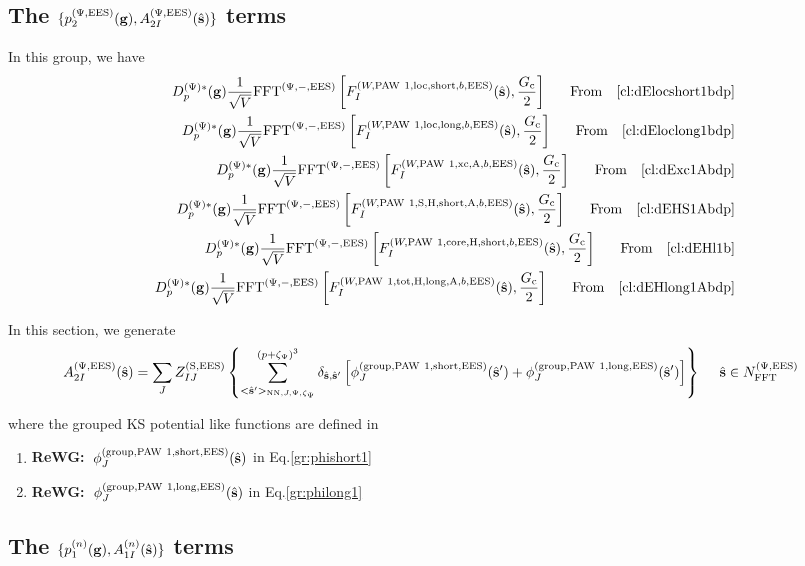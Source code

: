 \documentclass[paper=a4, fontsize=11pt]{article} %
\numberwithin{equation}{section} %
\numberwithin{figure}{section} %
\numberwithin{table}{section} %
\newcommand{\bg}{{\bf{g}}}
\newcommand{\hs}{{\hat{\bf{s}}}}
\newcommand{\rS}{{\mathrm{S}}}
\newcommand{\rEES}{{\mathrm{EES}}}
\newcommand{\rxc}{{\mathrm{xc}}}
\newcommand{\rgr}{{\mathrm{group}}}
\newcommand{\rcore}{{\mathrm{core}}}
\newcommand{\rNN}{{\mathrm{NN}}}
\newcommand{\rshort}{{\mathrm{short}}}
\newcommand{\rlong}{{\mathrm{long}}}
\newcommand{\rP}{{\mathrm{PAW}}}
\newcommand{\rH}{{\mathrm{H}}}
\newcommand{\rA}{{\mathrm{A}}}
\newcommand{\rlo}{{\mathrm{loc}}}
\newcommand{\rtot}{{\mathrm{tot}}}
\newcommand{\NFFTpEES}{{N^{\mathrm{(\Psi,\rEES})}_{\mathrm{FFT}}}}
\newcommand{\hGc}{{\frac{G_{\mathrm{c}}}{2}}}
\newcommand{\Dpgc}{{D^{(\Psi)*}_p(\bg)}}
\newcommand{\FFTpiEES}{{\mathrm{FFT}^{(\Psi,-,\rEES)}}}
\newcommand{\pzp}{{(p+\zeta_{\Psi})^3}}
\newcommand{\hspJp}{{<\hs'>_{\rNN,J,\Psi,\zeta_\Psi}}}
\newcommand{\hsinpEES}{{\ \ \ \ \hs \in \NFFTpEES}}
\newcommand{\fr}{{\nonumber \ \ \ \ \ \mathrm{From}\ \ \ }}
\newcommand{\ReWG}{{{\bf ReWG:\ }}}
\begin{document}
\subsection{The $\{p_2^{(\Psi,\rEES)}(\bg), A_{2I}^{(\Psi,\rEES)}(\hs)\}$ terms}

In this group, we have
\begin{eqnarray}
&& \Dpgc \frac{1}{\sqrt V} \FFTpiEES \left[F_I^{(W,\rP\ 1,\rlo,\rshort,b,\rEES)}(\hs),\hGc\right] \fr \eqref{cl:dElocshort1bdp}\\
&& \Dpgc \frac{1}{\sqrt V} \FFTpiEES \left[F_I^{(W,\rP\ 1,\rlo,\rlong,b,\rEES)}(\hs),\hGc\right]\fr \eqref{cl:dEloclong1bdp}\\
&& \Dpgc \frac{1}{\sqrt V} \FFTpiEES \left[F_I^{(W,\rP\ 1,\rxc,\rA,b,\rEES)}(\hs),\hGc\right]\fr \eqref{cl:dExc1Abdp}\\
&& \Dpgc \frac{1}{\sqrt V} \FFTpiEES \left[F_I^{(W,\rP\ 1,\rS,\rH,\rshort,\rA,b,\rEES)}(\hs),\hGc\right] \fr \eqref{cl:dEHS1Abdp}\\
&& \Dpgc \frac{1}{\sqrt V} \FFTpiEES \left[F_I^{(W,\rP\ 1,\rcore,\rH,\rshort,b,\rEES)}(\hs),\hGc\right] \fr \eqref{cl:dEHl1b}\\
&&  \Dpgc \frac{1}{\sqrt{V}} \FFTpiEES\left[ F_I^{(W,\rP\ 1,\rtot,\rH,\rlong,\rA,b,\rEES)}(\hs),\hGc\right] \fr \eqref{cl:dEHlong1Abdp}
\end{eqnarray}

In this section, we generate 
\begin{equation}
\begin{split}\label{gr:groupedFDPsi}
A_{2I}^{(\Psi,\rEES)}(\hs) 
&=\sum_J Z_{IJ}^{(\rS,\rEES)} \left\{\sum_{\hspJp}^\pzp  \delta_{\hs,\hs'} \left[\phi_J^{(\rgr,\rP\ 1,\rshort,\rEES)}(\hs') + \phi_J^{(\rgr,\rP\ 1,\rlong,\rEES)}(\hs') \right] \right\} \hsinpEES
\end{split}
\end{equation}

where the grouped KS potential like functions are defined in
\begin{enumerate}
\item \ReWG $\phi_J^{(\rgr,\rP\ 1,\rshort,\rEES)}(\hs)$ in Eq.\eqref{gr:phishort1}
\item \ReWG $\phi_J^{(\rgr,\rP\ 1,\rlong,\rEES)}(\hs)$ in Eq.\eqref{gr:philong1}
\end{enumerate}

\subsection{The $\{p_1^{(n)}(\bg), A_{1I}^{(n)}(\hs)\}$ terms}
\end{document}
